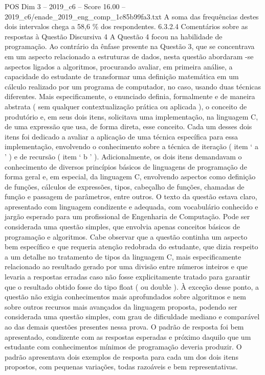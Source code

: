 \begin{textsample}{POS Dim 3 – 2019\_c6 – Score 16.00 – 2019\_c6/enade\_2019\_eng\_comp\_1c85b99fa3.txt}
A soma das frequências destes dois intervalos chega a 58,6 \% dos respondentes. 6.3.2.4 Comentários sobre as respostas à Questão Discursiva 4 A Questão 4 focou na habilidade de programação.
Ao contrário da ênfase presente na Questão 3, que se concentrava em um aspecto relacionado a estruturas de dados, nesta questão abordaram -se aspectos ligados a algoritmos, procurando avaliar, em primeira análise, a capacidade do estudante de transformar uma definição matemática em um cálculo realizado por um programa de computador, no caso, usando duas técnicas diferentes.
Mais especificamente, o enunciado definia, formalmente e de maneira abstrata ( sem qualquer contextualização prática ou aplicada ), o conceito de produtório e, em seus dois itens, solicitava uma implementação, na linguagem C, de uma expressão que usa, de forma direta, esse conceito.
Cada um desses dois itens foi dedicado a avaliar a aplicação de uma técnica específica para essa implementação, envolvendo o conhecimento sobre a técnica de iteração ( item ‘ a ’ ) e de recursão ( item ‘ b ’ ).
Adicionalmente, os dois itens demandavam o conhecimento de diversos princípios básicos de linguagens de programação de forma geral e, em especial, da linguagem C, envolvendo aspectos como definição de funções, cálculos de expressões, tipos, cabeçalho de funções, chamadas de função e passagem de parâmetros, entre outros.
O texto da questão estava claro, apresentado com linguagem condizente e adequada, com vocabulário conhecido e jargão esperado para um profissional de Engenharia de Computação.
Pode ser considerada uma questão simples, que envolvia apenas conceitos básicos de programação e algoritmos.
Cabe observar que a questão continha um aspecto bem específico e que requeria atenção redobrada do estudante, que dizia respeito a um detalhe no tratamento de tipos da linguagem C, mais especificamente relacionado ao resultado gerado por uma divisão entre números inteiros e que levaria a respostas erradas caso não fosse explicitamente tratado para garantir que o resultado obtido fosse do tipo float ( ou double ).
À exceção desse ponto, a questão não exigia conhecimentos mais aprofundados sobre algoritmos e nem sobre outros recursos mais avançados da linguagem proposta, podendo ser considerada uma questão simples, com grau de dificuldade mediano e comparável ao das demais questões presentes nessa prova.
O padrão de resposta foi bem apresentado, condizente com as respostas esperadas e próximo daquilo que um estudante com conhecimentos mínimos de programação deveria produzir.
O padrão apresentava dois exemplos de resposta para cada um dos dois itens propostos, com pequenas variações, todas razoáveis e bem representativas.

\end{textsample}
